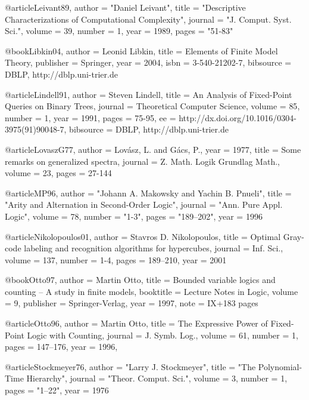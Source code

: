 \documentclass{article}
\begin{document}
@article{Leivant89,
  author    = "Daniel Leivant",
  title     = "Descriptive Characterizations of Computational Complexity",
  journal   = "J. Comput. Syst. Sci.",
  volume    = 39,
  number    = 1,
  year      = 1989,
  pages     = "51-83"
}



@book{Libkin04,
  author    = {Leonid Libkin},
  title     = {Elements of Finite Model Theory},
  publisher = {Springer},
  year      = {2004},
  isbn      = {3-540-21202-7},
  bibsource = {DBLP, http://dblp.uni-trier.de}
}

@article{Lindell91,
  author    = {Steven Lindell},
  title     = {An Analysis of Fixed-Point Queries on Binary Trees},
  journal   = {Theoretical Computer Science},
  volume    = {85},
  number    = {1},
  year      = {1991},
  pages     = {75-95},
  ee        = {http://dx.doi.org/10.1016/0304-3975(91)90048-7},
  bibsource = {DBLP, http://dblp.uni-trier.de}
}

@article{LovaszG77,
  author    = {Lov{\'a}sz, L. and G{\'a}cs, P.},
  year      = 1977, 
  title     = {Some remarks on generalized spectra}, 
  journal   = {Z. Math. Logik Grundlag Math.},
  volume    = 23, 
  pages     = {27-144}
}


@article{MP96,
  author    = "Johann A. Makowsky and Yachin B. Pnueli",
  title     = "Arity and Alternation in Second-Order Logic",
  journal   = "Ann. Pure Appl. Logic",
  volume    = 78,
  number    = "1-3",
  pages     = "189--202",
  year      = 1996
}

@article{Nikolopoulos01,
  author    = {Stavros D. Nikolopoulos},
  title     = {Optimal Gray-code labeling and recognition algorithms for hypercubes},
  journal   = {Inf. Sci.},
  volume    = {137},
  number    = {1-4},
  pages     = {189--210},
  year      = {2001}
}

@book{Otto97,
 author    = {Martin Otto},
 title     = {Bounded variable logics and counting 
               -- {A} study in finite models},
 booktitle = {Lecture Notes in Logic},
 volume    = {9},
 publisher = {Springer-Verlag},
 year      = {1997},
 note      = {IX+183 pages}
}

@article{Otto96,
  author    = {Martin Otto},
  title     = {The Expressive Power of Fixed-Point Logic with Counting},
  journal   = {J. Symb. Log.},
  volume    = {61},
  number    = {1},
  pages     = {147--176},
  year      = {1996},
}


@article{Stockmeyer76,
  author    = "Larry J. Stockmeyer",
  title     = "The Polynomial-Time Hierarchy",
  journal   = "Theor. Comput. Sci.",
  volume    = 3,
  number    = 1,
  pages     = "1--22",
  year      = 1976
}
\end{document}
